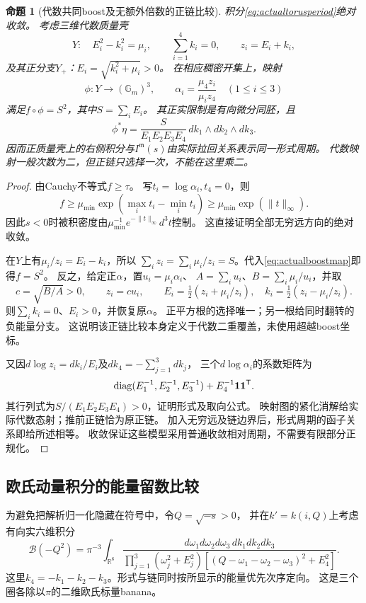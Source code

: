 \documentclass[11pt,a4paper]{ctexart}
\theoremstyle{cnplain}\newtheorem{theorem}{定理}[section]
\newtheorem{proposition}[theorem]{命题}
\theoremstyle{definition}\newtheorem{definition}[theorem]{定义}
\theoremstyle{remark}\newtheorem{remark}[theorem]{注}
\begin{document}
\begin{proposition}[代数共同boost及无额外倍数的正链比较]\label{prop:actualboost}
积分\eqref{eq:actualtorusperiod}绝对收敛。
考虑三维代数质量壳
\[
 Y:\quad E_i^2-k_i^2=\mu_i,\qquad \sum_{i=1}^4 k_i=0,
 \qquad z_i=E_i+k_i,
\]
及其正分支$Y_+$：$E_i=\sqrt{k_i^2+\mu_i}>0$。
在相应稠密开集上，映射
\begin{equation}\label{eq:actualboostmap}
 \phi:Y\longrightarrow (\mathbb G_m)^3,\qquad
 \alpha_i=\frac{\mu_4z_i}{\mu_i z_4}\quad(1\leq i\leq3)
\end{equation}
满足$f\circ\phi=S^2$，其中$S=\sum_i E_i$。
其正实限制是有向微分同胚，且
\begin{equation}\label{eq:actualboostform}
 \phi^*\eta=\frac{S}{E_1E_2E_3E_4}\,dk_1\wedge dk_2\wedge dk_3.
\end{equation}
因而正质量壳上的右侧积分与$I^{\mathfrak m}(s)$由实际拉回关系表示同一形式周期。
代数映射一般次数为二，但正链只选择一次，不能在这里乘二。
\end{proposition}
\begin{proof}
由Cauchy不等式$f\geq\tau$。
写$t_i=\log\alpha_i,t_4=0$，则
\[
 f\geq\mu_{\min}\exp(\max_i t_i-\min_i t_i)
       \geq\mu_{\min}\exp(\|t\|_\infty).
\]
因此$s<0$时被积密度由$\mu_{\min}^{-1}e^{-\|t\|_\infty}d^3t$控制。
这直接证明全部无穷远方向的绝对收敛。

在$Y$上有$\mu_i/z_i=E_i-k_i$，所以
$\sum_i z_i=\sum_i\mu_i/z_i=S$。代入\eqref{eq:actualboostmap}即得$f=S^2$。
反之，给定正$\alpha$，置$u_i=\mu_i\alpha_i$、
$A=\sum_i u_i$、$B=\sum_i\mu_i/u_i$，并取
\[
 c=\sqrt{B/A}>0,\qquad z_i=cu_i,\qquad
 E_i=\tfrac12(z_i+\mu_i/z_i),\quad k_i=\tfrac12(z_i-\mu_i/z_i).
\]
则$\sum_i k_i=0$、$E_i>0$，并恢复原$\alpha$。
正平方根的选择唯一；另一根给同时翻转的负能量分支。
这说明该正链比较本身定义于代数二重覆盖，未使用超越boost坐标。

又因$d\log z_i=dk_i/E_i$及$dk_4=-\sum_{j=1}^3dk_j$，
三个$d\log\alpha_i$的系数矩阵为
\[
 \operatorname{diag}(E_1^{-1},E_2^{-1},E_3^{-1})
                  +E_4^{-1}{\bf1}{\bf1}^{\mathsf T}.
\]
其行列式为$S/(E_1E_2E_3E_4)>0$，证明形式及取向公式。
映射图的紧化消解给实际代数态射；推前正链恰为原正链。
加入无穷远及链边界后，形式周期的函子关系即给所述相等。
收敛保证这些模型采用普通收敛相对周期，不需要有限部分正规化。
\end{proof}

\subsection{欧氏动量积分的能量留数比较}
为避免把解析归一化隐藏在符号中，令$Q=\sqrt{-s}>0$，
并在$k'=k(i,Q)$上考虑有向实六维积分
\begin{equation}\label{eq:actualmomentum}
 \mathcal B(-Q^2)=\pi^{-3}\int_{\mathbb R^6}
 \frac{d\omega_1d\omega_2d\omega_3\,dk_1dk_2dk_3}
 {\prod_{j=1}^3(\omega_j^2+E_j^2)
       [(Q-\omega_1-\omega_2-\omega_3)^2+E_4^2]}.
\end{equation}
这里$k_4=-k_1-k_2-k_3$。形式与链同时按所显示的能量优先次序定向。
这是三个圈各除以$\pi$的二维欧氏标量banana。
\end{document}
